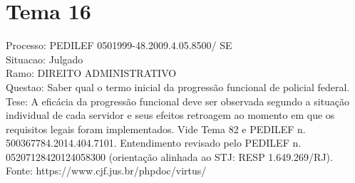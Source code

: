 \documentclass[12pt]{article}
\begin{document}
\section*{Tema 16}
Processo: PEDILEF 0501999-48.2009.4.05.8500/ SE\\
Situacao: Julgado\\
Ramo: DIREITO ADMINISTRATIVO\\
Questao: Saber qual o termo inicial da progressão funcional de policial federal.\\
Tese: A eficácia da progressão funcional deve ser observada segundo a situação individual de cada servidor e seus efeitos retroagem ao momento em que os requisitos legais foram implementados. Vide Tema 82 e PEDILEF n. 500367784.2014.404.7101. Entendimento revisado pelo PEDILEF n. 05207128420124058300 (orientação alinhada ao STJ: RESP 1.649.269/RJ).\\
Fonte: https://www.cjf.jus.br/phpdoc/virtus/
\end{document}
